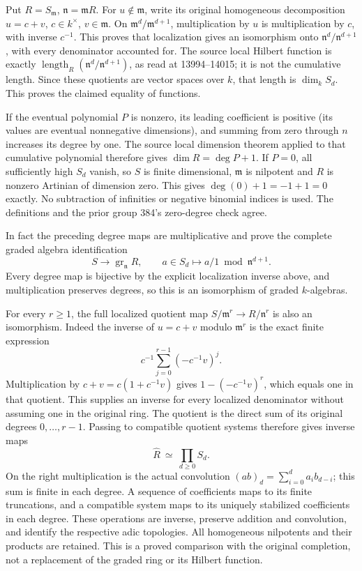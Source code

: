 Put \(R=S_{\mathfrak m}\), \(\mathfrak n=\mathfrak mR\). For \(u\notin\mathfrak m\), write its original homogeneous decomposition \(u=c+v\), \(c\in k^\times\), \(v\in\mathfrak m\). On \(\mathfrak m^d/\mathfrak m^{d+1}\), multiplication by \(u\) is multiplication by \(c\), with inverse \(c^{-1}\). This proves that localization gives an isomorphism onto \(\mathfrak n^d/\mathfrak n^{d+1}\), with every denominator accounted for. The source local Hilbert function is exactly \(\operatorname{length}_R(\mathfrak n^d/\mathfrak n^{d+1})\), as read at 13994--14015; it is not the cumulative length. Since these quotients are vector spaces over \(k\), that length is \(\dim_k S_d\). This proves the claimed equality of functions.

If the eventual polynomial \(P\) is nonzero, its leading coefficient is positive (its values are eventual nonnegative dimensions), and summing from zero through \(n\) increases its degree by one. The source local dimension theorem applied to that cumulative polynomial therefore gives \(\dim R=\deg P+1\). If \(P=0\), all sufficiently high \(S_d\) vanish, so \(S\) is finite dimensional, \(\mathfrak m\) is nilpotent and \(R\) is nonzero Artinian of dimension zero. This gives \(\deg(0)+1=-1+1=0\) exactly. No subtraction of infinities or negative binomial indices is used. The definitions and the prior group 384's zero-degree check agree.

In fact the preceding degree maps are multiplicative and prove the complete graded algebra identification \[
 S\longrightarrow\operatorname{gr}_{\mathfrak n}R,\qquad
 a\in S_d\longmapsto a/1\bmod\mathfrak n^{d+1}.
\] Every degree map is bijective by the explicit localization inverse above, and multiplication preserves degrees, so this is an isomorphism of graded \(k\)-algebras.

For every \(r\geq1\), the full localized quotient map \(S/\mathfrak m^r\to R/\mathfrak n^r\) is also an isomorphism. Indeed the inverse of \(u=c+v\) modulo \(\mathfrak m^r\) is the exact finite expression \[
 c^{-1}\sum_{j=0}^{r-1}(-c^{-1}v)^j.
\] Multiplication by \(c+v=c(1+c^{-1}v)\) gives \(1-(-c^{-1}v)^r\), which equals one in that quotient. This supplies an inverse for every localized denominator without assuming one in the original ring. The quotient is the direct sum of its original degrees \(0,\ldots,r-1\). Passing to compatible quotient systems therefore gives inverse maps \[
 \widehat{R}\ \simeq\ \prod_{d\geq0}S_d .
\] On the right multiplication is the actual convolution \((a b)_d=\sum_{i=0}^d a_i b_{d-i}\); this sum is finite in each degree. A sequence of coefficients maps to its finite truncations, and a compatible system maps to its uniquely stabilized coefficients in each degree. These operations are inverse, preserve addition and convolution, and identify the respective adic topologies. All homogeneous nilpotents and their products are retained. This is a proved comparison with the original completion, not a replacement of the graded ring or its Hilbert function.

